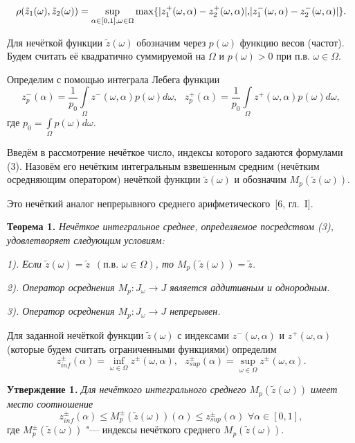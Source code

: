 \begin{equation*}
\rho(\tilde{z}_1(\omega), \tilde{z}_2(\omega)) = \sup\limits_{\alpha\in[0,1], \omega\in\Omega}\max\{|z_1^{+}(\omega, \alpha) - z_2^{+}(\omega, \alpha)|, $$$$|z_1^{-}(\omega, \alpha) - z_2^{-}(\omega, \alpha)|\}.
\end{equation*}




Для нечёткой функции $\tilde{z}(\omega)$ обозначим через $p(\omega)$ функцию весов (частот).  Будем считать её квадратично суммируемой на $\Omega$ и $p(\omega)>0$ при п.в. $\omega\in\Omega$.

Определим с помощью интеграла Лебега функции
\begin{equation}
z^{-}_{p}(\alpha) = \frac{1}{p_0}\int\limits_{\Omega}z^{-}(\omega, \alpha)p(\omega)d\omega,\,\,\,\,z^{+}_{p}(\alpha) = \frac{1}{p_0}\int\limits_{\Omega}z^{+}(\omega, \alpha)p(\omega)d\omega,
\end{equation}
где $p_0 = \int\limits_{\Omega}p(\omega)d\omega$.


Введём в рассмотрение нечёткое число, индексы которого задаются формулами (3). Назовём его нечётким интегральным взвешенным средним (нечётким осредняющим оператором) нечёткой функции $\tilde{z}(\omega)$ и обозначим $M_p(\tilde{z}(\omega))$.

Это нечёткий аналог непрерывного среднего арифметического~[6, гл.~{I}].


\textbf{Теорема 1.} \textit{Нечёткое интегральное среднее, определяемое посредством (3), удовлетворяет следующим условиям:}

\textit{1). Если $\tilde{z}(\omega) = \tilde{z}\,\,\,(\text{п.в.}\,\,\omega\in\Omega)$, то $M_p(\tilde{z}(\omega)) = \tilde{z}$.
}

\textit{2). Оператор осреднения $M_p: J_{\omega}\rightarrow J$ является аддитивным и однородным.
}

\textit{3). Оператор осреднения $M_p: J_{\omega}\rightarrow J$ непрерывен.
}


Для заданной нечёткой функции $\tilde{z}(\omega)$ с индексами $z^{-}(\omega, \alpha)$ и $z^{+}(\omega, \alpha)$ (которые будем считать ограниченными функциями) определим
$$
z_{inf}^{\pm}(\alpha)=\inf\limits_{\omega\in\Omega}z^{\pm}(\omega, \alpha),\,\,\,\,z_{sup}^{\pm}(\alpha)=\sup\limits_{\omega\in\Omega}z^{\pm}(\omega, \alpha).
$$

\textbf{Утверждение 1.} \textit{Для нечёткого интегрального среднего $M_p(\tilde{z}(\omega))$ имеет место соотношение }
$$
z_{inf}^{\pm}(\alpha)\leq M_p^{\pm}(\tilde{z}(\omega))(\alpha) \leq z_{sup}^{\pm}(\alpha)\,\,\forall\alpha\in[0, 1],
$$
где $M_p^{\pm}(\tilde{z}(\omega))$ "--- индексы нечёткого среднего $M_p(\tilde{z}(\omega))$.



